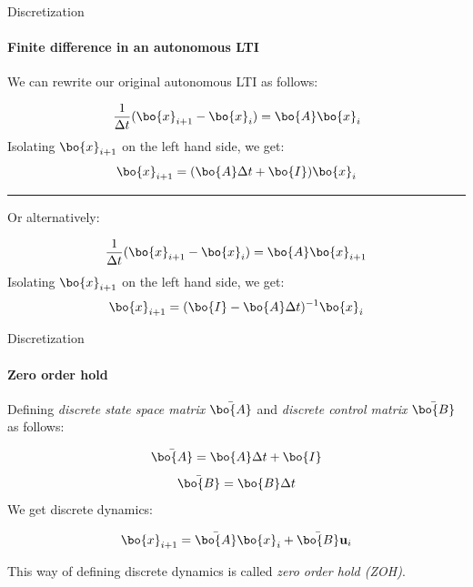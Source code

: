 \documentclass{beamer}
\begin{document}
\begin{frame}{Discretization}
\framesubtitle{Finite difference in an autonomous LTI}
\begin{flushleft}

We can rewrite our original autonomous LTI as follows:

\begin{equation}
\frac{1}{\Delta t}(\bo{x}_{i + 1} - \bo{x}_i) = \bo{A} \bo{x}_i
\end{equation}
Isolating $\bo{x}_{i + 1}$ on the left hand side, we get:
\begin{equation}
\bo{x}_{i + 1} = (\bo{A} \Delta t + \bo{I}) \bo{x}_i
\end{equation}

\noindent\rule{11cm}{0.4pt}

Or alternatively:

\begin{equation}
\frac{1}{\Delta t}(\bo{x}_{i + 1} - \bo{x}_i) = \bo{A} \bo{x}_{i + 1}
\end{equation}
Isolating $\bo{x}_{i + 1}$ on the left hand side, we get:
\begin{equation}
\bo{x}_{i + 1} = (\bo{I} - \bo{A} \Delta t)^{-1} \bo{x}_i 
\end{equation}

\end{flushleft}
\end{frame}




\begin{frame}{Discretization}
\framesubtitle{Zero order hold}
\begin{flushleft}

Defining \emph{discrete state space matrix} $\bar{\bo{A}}$ and \emph{discrete control matrix} $\bar{\bo{B}}$ as follows:

\begin{equation}
\bar{\bo{A}} = \bo{A} \Delta t + \bo{I}
\end{equation}
\begin{equation}
\bar{\bo{B}} = \bo{B} \Delta t
\end{equation}
%
We get discrete dynamics:

\begin{equation}
\bo{x}_{i+1} = \bar{\bo{A}} \bo{x}_i + \bar{\bo{B}} \mathbf u_i
\end{equation}

This way of defining discrete dynamics is called \emph{zero order hold (ZOH)}.

\end{flushleft}
\end{frame}
\end{document}
